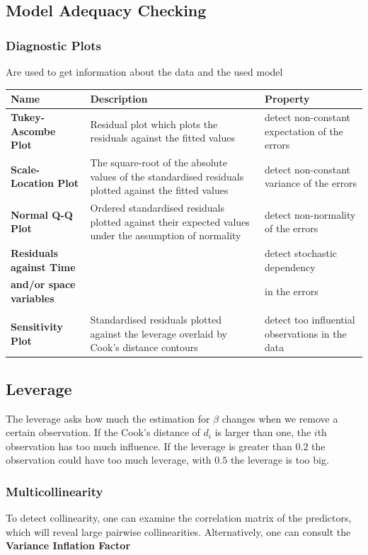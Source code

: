 \documentclass[11pt]{article}
\begin{document}
\subsection{Model Adequacy Checking}
\subsubsection{Diagnostic Plots}
Are used to get information about the data and the used model

\vspace{1em}
\noindent
\begin{tabularx}{\textwidth}{l X X}
	\hline
	\textbf{Name} & \textbf{Description} & \textbf{Property}\\
	\hline
	\textbf{Tukey-Ascombe Plot} & Residual plot which plots the residuals against the fitted values & detect non-constant expectation of the errors\\
	\textbf{Scale-Location Plot} & The square-root of the absolute values of the standardised residuals plotted against the fitted values & detect non-constant variance of the errors\\
	\textbf{Normal Q-Q Plot} & Ordered standardised residuals plotted against their expected values under the assumption of normality & detect non-normality of the errors\\
	\textbf{Residuals against Time} & & detect stochastic dependency\\
	\textbf{and/or space variables} & & in the errors\\
	& & \\
	\textbf{Sensitivity Plot} & Standardised residuals plotted against the leverage overlaid by Cook's distance contours & detect too influential observations in the data\\
\end{tabularx}

\subsection{Leverage}
The leverage asks how much the estimation for $\beta$ changes when we remove a certain observation.
If the Cook's distance of $d_i$ is larger than one, the $i$th observation has too much influence. If the leverage is greater than $0.2$ the observation could have too much leverage, with $0.5$ the leverage is too big.

\subsubsection{Multicollinearity}
To detect collinearity, one can examine the correlation matrix of the predictors, which will reveal large pairwise collinearities. Alternatively, one can consult the \textbf{Variance Inflation Factor}
\end{document}
